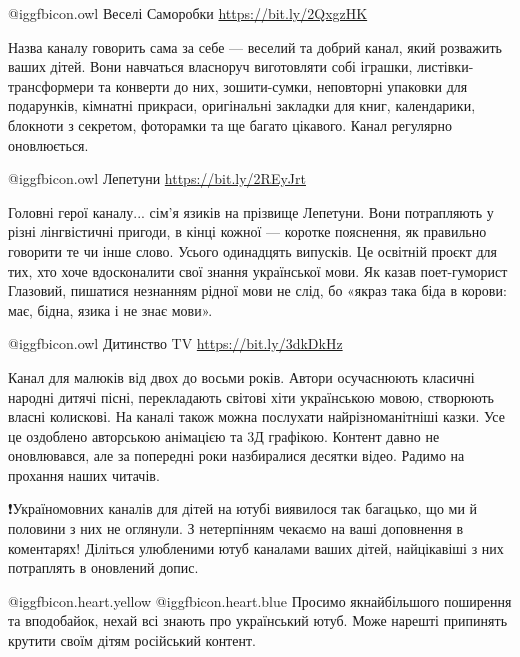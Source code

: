  @igg{fbicon.owl} Веселі Саморобки \url{https://bit.ly/2QxgzHK}

Назва каналу говорить сама за себе — веселий та добрий канал, який розважить
ваших дітей. Вони навчаться власноруч виготовляти собі іграшки,
листівки-трансформери та конверти до них, зошити-сумки, неповторні упаковки для
подарунків, кімнатні прикраси, оригінальні закладки для книг, календарики,
блокноти з секретом, фоторамки та ще багато цікавого. Канал регулярно
оновлюється.

 @igg{fbicon.owl} Лепетуни \url{https://bit.ly/2REyJrt}

Головні герої каналу... сім’я язиків на прізвище Лепетуни. Вони потрапляють у
різні лінгвістичні пригоди, в кінці кожної — коротке пояснення, як правильно
говорити те чи інше слово. Усього одинадцять випусків. Це освітній проєкт для
тих, хто хоче вдосконалити свої знання української мови. Як казав поет-гуморист
Глазовий, пишатися незнанням рідної мови не слід, бо «якраз така біда в корови:
має, бідна, язика і не знає мови».

 @igg{fbicon.owl} Дитинство TV \url{https://bit.ly/3dkDkHz}

Канал для малюків від двох до восьми років. Автори осучаснюють класичні народні
дитячі пісні, перекладають світові хіти українською мовою, створюють власні
колискові. На каналі також можна послухати найрізноманітніші казки. Усе це
оздоблено авторською анімацією та 3Д графікою. Контент давно не оновлювався,
але за попередні роки назбиралися десятки відео. Радимо на прохання наших
читачів.

❗️Україномовних каналів для дітей на ютубі виявилося так багацько, що ми й
половини з них не оглянули. З нетерпінням чекаємо на ваші доповнення в
коментарях! Діліться улюбленими ютуб каналами ваших дітей, найцікавіші з них
потраплять в оновлений допис.

@igg{fbicon.heart.yellow}  @igg{fbicon.heart.blue} Просимо якнайбільшого
поширення та вподобайок, нехай всі знають про український ютуб. Може нарешті
припинять крутити своїм дітям російський контент.

